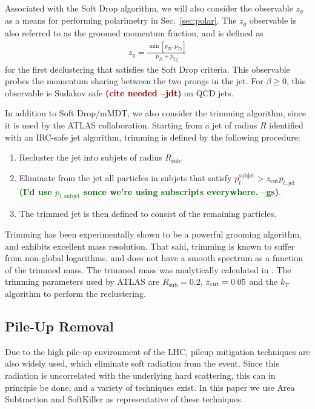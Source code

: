 \documentclass[11pt,letterpaper]{article}
\DeclareRobustCommand{\Sec}[1]{Sec.~\ref{#1}}
\newcommand{\zcut}{z_{\rm cut}}
\newcommand{\jdt}[1]{\textbf{\textcolor{darkred}{(#1 --jdt)}}}
\newcommand{\gs}[1]{\textbf{\textcolor{darkgreen}{(#1 --gs)}}}
\begin{document}
Associated with the Soft Drop algorithm, we will also consider the observable $z_g$ as a means for performing polarimetry in \Sec{sec:polar}.
%
The $z_g$ observable is also referred to as the groomed momentum fraction, and is defined as
%
\begin{align}
z_g=\frac{\min\left[ p_{Ti}, p_{Tj}  \right]}{p_{Ti}+p_{Tj}}
\end{align}
%
for the first declustering that satisfies the Soft Drop criteria.
%
This observable probes the momentum sharing between the two prongs in the
jet. For $\beta \ge 0$, this observable is Sudakov safe \jdt{cite needed} on QCD
jets.

In addition to Soft Drop/mMDT, we also consider the trimming algorithm, since it is used by the ATLAS collaboration.
%
Starting from a jet of radius $R$ identified with an IRC-safe jet algorithm, trimming is defined by the following procedure:
%
\begin{enumerate}
%
\item Recluster the jet into subjets of radius $R_{\text{sub}}$.
%
\item Eliminate from the jet all particles in subjets that satisfy
  $p_t^{\text{subjet}} > z_{\text{cut}}p_{t,\text{jet}}$ \gs{I'd use
    $p_{t,\text{subjet}}$ sonce we're using subscripts everywhere.}.
%
\item The trimmed jet is then defined to consist of the remaining particles.
%
\end{enumerate}
%
Trimming has been experimentally shown to be a powerful grooming algorithm, and exhibits excellent mass resolution.
%
That said, trimming is known to suffer from non-global logarithms, and does not have a smooth spectrum as a function of the trimmed mass.
%
The trimmed mass was analytically calculated in \cite{Dasgupta:2013ihk}.
%
The trimming parameters used by ATLAS are $R_{\text{sub}}=0.2$,  $ \zcut=0.05$ and the $k_T$ algorithm to perform the reclustering.

\subsection{Pile-Up Removal}\label{sec:pu_tech}

Due to the high pile-up environment of the LHC, pileup mitigation techniques \cite{Cacciari:2007fd,Alon:2011xb,Soyez:2012hv,Tseng:2013dva,Krohn:2013lba,Cacciari:2014gra,Bertolini:2014bba} are also widely used, which eliminate soft radiation from the event.
%
Since this radiation is uncorrelated with the underlying hard scattering, this can in principle be done, and a variety of techniques exist.
%
In this paper we use Area Subtraction \cite{Cacciari:2007fd,Cacciari:2008gn} and SoftKiller \cite{Cacciari:2014gra} as representative of these techniques.
\end{document}
